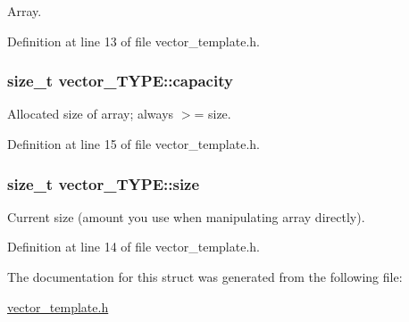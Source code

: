 Array. 



Definition at line 13 of file vector\-\_\-template.\-h.

\hypertarget{structvector___t_y_p_e_aa2f337cea7d3cb1e1ed4f5ee5a22678f}{
\subsubsection[{capacity}]{\setlength{\rightskip}{0pt plus 5cm}size\-\_\-t vector\-\_\-\-T\-Y\-P\-E\-::capacity}}\label{structvector___t_y_p_e_aa2f337cea7d3cb1e1ed4f5ee5a22678f}


Allocated size of array; always $>$= size. 



Definition at line 15 of file vector\-\_\-template.\-h.

\hypertarget{structvector___t_y_p_e_a5c187692d3e0d1659d7024a751ec4b4d}{
\subsubsection[{size}]{\setlength{\rightskip}{0pt plus 5cm}size\-\_\-t vector\-\_\-\-T\-Y\-P\-E\-::size}}\label{structvector___t_y_p_e_a5c187692d3e0d1659d7024a751ec4b4d}


Current size (amount you use when manipulating array directly). 



Definition at line 14 of file vector\-\_\-template.\-h.



The documentation for this struct was generated from the following file\-:\begin{DoxyCompactItemize}
\item 
\hyperlink{vector__template_8h}{vector\-\_\-template.\-h}\end{DoxyCompactItemize}
